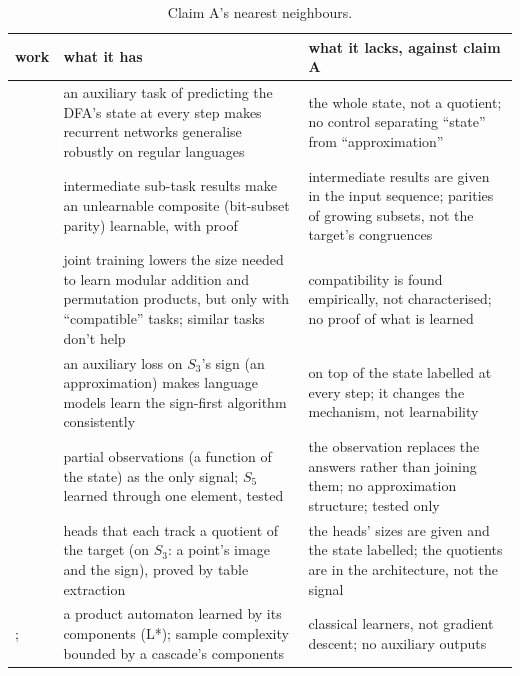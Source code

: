 \documentclass[11pt]{article}
\begin{document}
\begin{table}[h]
\centering
\small
\begin{tabularx}{\textwidth}{lXX}
\toprule
work & what it has & what it lacks, against claim A \\
\midrule
\citet{dan-2022-robust-generalization-regular-languages} & an auxiliary task of predicting the DFA's state at every step makes recurrent networks generalise robustly on regular languages & the whole state, not a quotient; no control separating ``state'' from ``approximation'' \\
\citet{wies-2023-sub-task-decomposition-sequence-tasks} & intermediate sub-task results make an unlearnable composite (bit-subset parity) learnable, with proof & intermediate results are given in the input sequence; parities of growing subsets, not the target's congruences \\
\citet{both-2025-joint-task-training-small-models} & joint training lowers the size needed to learn modular addition and permutation products, but only with ``compatible'' tasks; similar tasks don't help & compatibility is found empirically, not characterised; no proof of what is learned \\
\citet{li-2025-how-language-models-track-state} & an auxiliary loss on $S_3$'s sign (an approximation) makes language models learn the sign-first algorithm consistently & on top of the state labelled at every step; it changes the mechanism, not learnability \\
\citet{liu-2022-transformers-shortcuts-automata} & partial observations (a function of the state) as the only signal; $S_5$ learned through one element, tested & the observation replaces the answers rather than joining them; no approximation structure; tested only \\
\citet{brandoit-2026-length-independent-state-tracking} & heads that each track a quotient of the target (on $S_3$: a point's image and the sign), proved by table extraction & the heads' sizes are given and the state labelled; the quotients are in the architecture, not the signal \\
\citet{moerman-2017-learning-product-automata}; \citet{ronca-2023-automata-cascades-expressivity-sample-complexity} & a product automaton learned by its components (L*); sample complexity bounded by a cascade's components & classical learners, not gradient descent; no auxiliary outputs \\
\bottomrule
\end{tabularx}
\caption{Claim A's nearest neighbours.}
\end{table}
\end{document}

